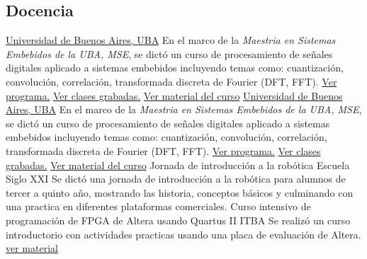       \vfill{}

   \subsection{\bfseries{Docencia}}
                   {\href{\linkuba}{Universidad de Buenos Aires, UBA}} {}{}{En el marco de la \emph{Maestria en Sistemas Embebidos de la UBA, MSE}, se dictó un curso de procesamiento de señales digitales  aplicado a sistemas embebidos incluyendo temas como: cuantización, convolución, correlación, transformada discreta de Fourier (DFT, FFT). \href{\linkmse}{Ver programa.} \href{\linkmsepsftwentyonevideos}{Ver clases grabadas.} \href{\linkmsepsftwentyonematerial}{Ver material del curso}}
                                  {\href{\linkuba}{Universidad de Buenos Aires, UBA}} {}{}{En el marco de la \emph{Maestria en Sistemas Embebidos de la UBA, MSE}, se dictó un curso de procesamiento de señales digitales  aplicado a sistemas embebidos incluyendo temas como: cuantización, convolución, correlación, transformada discreta de Fourier (DFT, FFT). \href{\linkmse}{Ver programa.} \href{\linkmsepsfvideos}{Ver clases grabadas.} \href{\linkmsepsfmaterial}{Ver material del curso}}
       { Jornada de introducción a la robótica}                               { Escuela Siglo XXI} {} {} { Se dictó una jornada de introducción a la robótica para alumnos de tercer a quinto año, mostrando las historia, conceptos básicos y culminando con una practica en diferentes plataformas comerciales.}{}
       { Curso intensivo de programación de FPGA de Altera usando Quartus II} { ITBA}{} {} { Se realizó un curso introductorio con actividades practicas usando una placa de evaluación de Altera. \href { \linkfpgasig } { ver material}}
      \vfill{}

